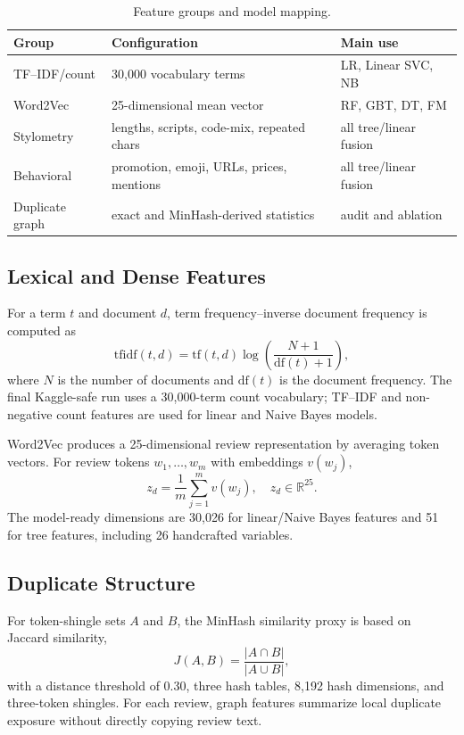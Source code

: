 \documentclass[conference]{IEEEtran}
\begin{document}
\begin{table}[t]
\caption{Feature groups and model mapping.}
\label{tab:features}
\centering\scriptsize
\begin{tabular}{p{}p{}p{}}
\toprule
Group & Configuration & Main use\\
\midrule
TF--IDF/count & 30,000 vocabulary terms & LR, Linear SVC, NB\\
Word2Vec & 25-dimensional mean vector & RF, GBT, DT, FM\\
Stylometry & lengths, scripts, code-mix, repeated chars & all tree/linear fusion\\
Behavioral & promotion, emoji, URLs, prices, mentions & all tree/linear fusion\\
Duplicate graph & exact and MinHash-derived statistics & audit and ablation\\
\bottomrule
\end{tabular}
\end{table}

\subsection{Lexical and Dense Features}
For a term $t$ and document $d$, term frequency--inverse document frequency is computed as
\begin{equation}
\mathrm{tfidf}(t,d)=\mathrm{tf}(t,d)\log\left(\frac{N+1}{\mathrm{df}(t)+1}\right),
\label{eq:tfidf}
\end{equation}
where $N$ is the number of documents and $\mathrm{df}(t)$ is the document frequency. The final Kaggle-safe run uses a 30,000-term count vocabulary; TF--IDF and non-negative count features are used for linear and Naive Bayes models.

Word2Vec produces a 25-dimensional review representation by averaging token vectors. For review tokens $w_1,\ldots,w_m$ with embeddings $v(w_j)$,
\begin{equation}
z_d=\frac{1}{m}\sum_{j=1}^{m}v(w_j),\quad z_d\in\mathbb{R}^{25}.
\label{eq:w2v}
\end{equation}
The model-ready dimensions are 30,026 for linear/Naive Bayes features and 51 for tree features, including 26 handcrafted variables.

\subsection{Duplicate Structure}
For token-shingle sets $A$ and $B$, the MinHash similarity proxy is based on Jaccard similarity,
\begin{equation}
J(A,B)=\frac{|A\cap B|}{|A\cup B|},
\label{eq:jaccard}
\end{equation}
with a distance threshold of 0.30, three hash tables, 8,192 hash dimensions, and three-token shingles. For each review, graph features summarize local duplicate exposure without directly copying review text.
\end{document}
